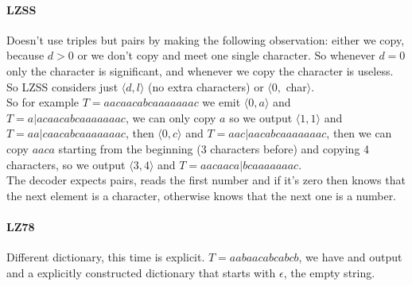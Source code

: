 \documentclass[10pt]{report}
\begin{document}
\paragraph{LZSS} Doesn't use triples but pairs by making the following observation: either we copy, because $d>0$ or we don't copy and meet one single character. So whenever $d=0$ only the character is significant, and whenever we copy the character is useless. So LZSS considers just $\langle d,l\rangle$ (no extra characters) or $\langle 0,$ char$\rangle$.\\So for example $T=aacaacabcaaaaaaac$ we emit $\langle 0,a\rangle$ and $T=a|acaacabcaaaaaaac$, we can only copy $a$ so we output $\langle 1,1\rangle$ and $T=aa|caacabcaaaaaaac$, then $\langle 0,c\rangle$ and $T=aac|aacabcaaaaaaac$, then we can copy $aaca$ starting from the beginning ($3$ characters before) and copying 4 characters, so we output $\langle 3,4\rangle$ and $T=aacaaca|bcaaaaaaac$.\\
The decoder expects pairs, reads the first number and if it's zero then knows that the next element is a character, otherwise knows that the next one is a number.
\paragraph{LZ78} Different dictionary, this time is explicit. $T=aabaacabcabcb$, we have and output and a explicitly constructed dictionary that starts with $\epsilon$, the empty string.
\end{document}
